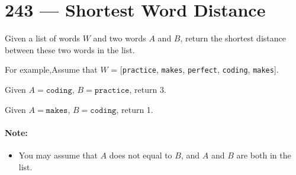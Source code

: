 \section{243 --- Shortest Word Distance}
Given a list of words $W$ and two words $A$ and $B$, return the shortest distance between these two words in the list.
\par
For example,Assume that $W$ = [\texttt{practice}, \texttt{makes}, \texttt{perfect}, \texttt{coding}, \texttt{makes}].
\par
Given $A = \texttt{coding}$, $B = \texttt{practice}$, return 3.
\par
Given $A = \texttt{makes}$, $B = \texttt{coding}$, return 1.
\paragraph{Note:}
\begin{itemize}
\item You may assume that $A$ does not equal to $B$, and $A$ and $B$ are both in the list.
\end{itemize}